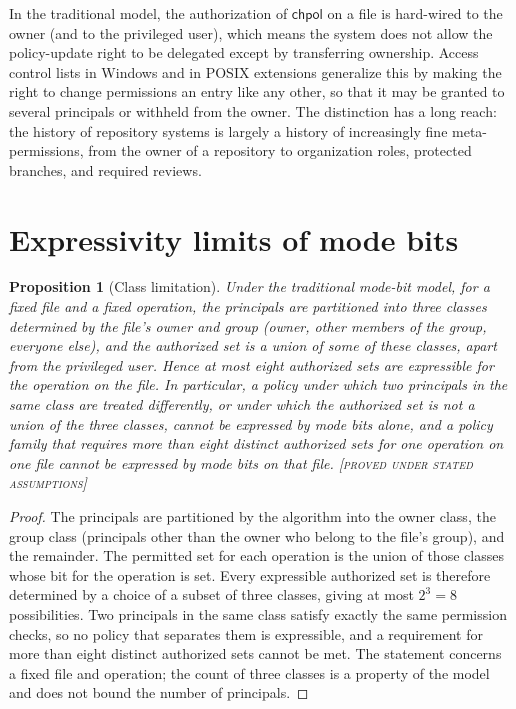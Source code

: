 \documentclass[11pt,twoside,openright]{book}
\theoremstyle{plain}
\newtheorem{proposition}[theorem]{Proposition}
\theoremstyle{definition}
\theoremstyle{remark}
\newcommand{\Proved}{\textup{\textsc{[proved under stated assumptions]}}}
\begin{document}
In the traditional model, the authorization of $\mathsf{chpol}$ on a file is hard-wired to the owner (and to the privileged user), which means the system does not allow the policy-update right to be delegated except by transferring ownership. Access control lists in Windows and in POSIX extensions generalize this by making the right to change permissions an entry like any other, so that it may be granted to several principals or withheld from the owner. The distinction has a long reach: the history of repository systems is largely a history of increasingly fine meta-permissions, from the owner of a repository to organization roles, protected branches, and required reviews.

\section{Expressivity limits of mode bits}

\begin{proposition}[Class limitation]\label{prop:classlimit}
Under the traditional mode-bit model, for a fixed file and a fixed operation, the principals are partitioned into three classes determined by the file's owner and group (owner, other members of the group, everyone else), and the authorized set is a union of some of these classes, apart from the privileged user. Hence at most eight authorized sets are expressible for the operation on the file. In particular, a policy under which two principals in the same class are treated differently, or under which the authorized set is not a union of the three classes, cannot be expressed by mode bits alone, and a policy family that requires more than eight distinct authorized sets for one operation on one file cannot be expressed by mode bits on that file.
\Proved{}
\end{proposition}

\begin{proof}
The principals are partitioned by the algorithm into the owner class, the group class (principals other than the owner who belong to the file's group), and the remainder. The permitted set for each operation is the union of those classes whose bit for the operation is set. Every expressible authorized set is therefore determined by a choice of a subset of three classes, giving at most $2^3=8$ possibilities. Two principals in the same class satisfy exactly the same permission checks, so no policy that separates them is expressible, and a requirement for more than eight distinct authorized sets cannot be met. The statement concerns a fixed file and operation; the count of three classes is a property of the model and does not bound the number of principals.
\end{proof}
\end{document}
